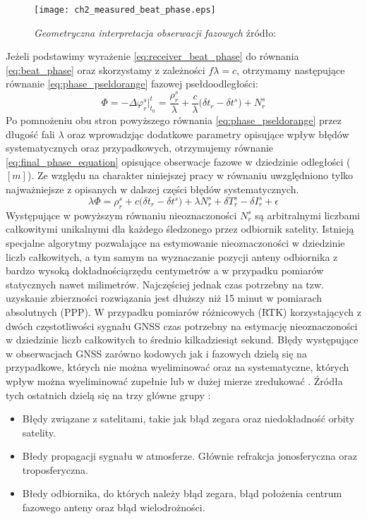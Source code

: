 \begin{figure}[H]
\centering
\texttt{[image: ch2\_measured\_beat\_phase.eps]}
\caption{\textit{Geometryczna interpretacja obserwacji fazowych} źródło: \cite[][strona 108]{hofmann_gnss}}
\label{fig:receiver_beat_phase}
\end{figure}
Jeżeli podstawimy wyrażenie \ref{eq:receiver_beat_phase} do równania \ref{eq:beat_phase} oraz skorzystamy z zależności $f\lambda = c$,
otrzymamy następujące równanie \ref{eq:phase_pseldorange} fazowej psełdoodległości:
\begin{equation}
	\Phi = - \Delta{\varphi}_r^s\big|_{t_0}^{t} = \frac{\rho_r^s}{\lambda} + \frac{c}{\lambda} \big({\delta}t_r - {\delta}t^s\big) + N_r^s
	\label{eq:phase_pseldorange}
\end{equation}
Po pomnożeniu obu stron powyższego równania \ref{eq:phase_pseldorange} przez długość fali $\lambda$ oraz wprowadzjąc dodatkowe parametry opisujące wpływ błędów 
systematycznych oraz przypadkowych, otrzymujemy równanie \ref{eq:final_phase_equation} opisujące obserwacje fazowe w dziedzinie odległości ($[m]$).
Ze względu na charakter niniejszej pracy w równaniu uwzględniono tylko najważniejsze z opisanych w dalszej części błędów systematycznych.
\begin{equation}
	\lambda\Phi = \rho_r^s + c\big({\delta}t_r - {\delta}t^s\big) + {\lambda}N_r^s + {\delta}T_r^s 
	- {\delta}I_r^s + \epsilon
	\label{final_phase_equation}
\end{equation}
Występujące w powyższym równaniu nieoznaczoności $N_r^s$ są arbitralnymi liczbami całkowitymi unikalnymi dla każdego śledzonego przez odbiornik satelity.
Istnieją specjalne algorytmy pozwalające na estymowanie nieoznaczoności w dziedzinie liczb całkowitych, a tym samym na wyznaczanie pozycji anteny odbiornika
z bardzo wysoką dokładnościąrzędu centymetrów a w przypadku pomiarów statycznych nawet milimetrów.
Najczęściej jednak czas potrzebny na tzw. uzyskanie zbierzności rozwiązania jest 
dłuższy niż 15 minut w pomiarach absolutnych (PPP). W przypadku pomiarów różnicowych (RTK) korzystających z dwóch częstotliwości sygnału GNSS czas potrzebny 
na estymację nieoznaczoności w dziedzinie liczb całkowitych to średnio kilkadziesiąt sekund.\newline
\indent Błędy występujące w obserwacjach GNSS zarówno kodowych jak i fazowych dzielą się na przypadkowe, których nie można wyeliminować oraz na 
systematyczne, których wpływ można wyeliminować zupełnie lub w dużej mierze zredukować \cite[][strona]{hofmann_gnss}.
Źródła tych ostatnich dzielą się na trzy główne grupy \cite[][strona 109]{hofmann_gnss}:
\begin{itemize}
	\item Błędy związane z satelitami, takie jak błąd zegara oraz niedokładność orbity satelity.
	\item Błedy propagacji sygnału w atmosferze. Głównie refrakcja jonosferyczna oraz troposferyczna.
	\item Błedy odbiornika, do których należy błąd zegara, błąd położenia centrum fazowego anteny oraz błąd wielodrożności. 
\end{itemize}

